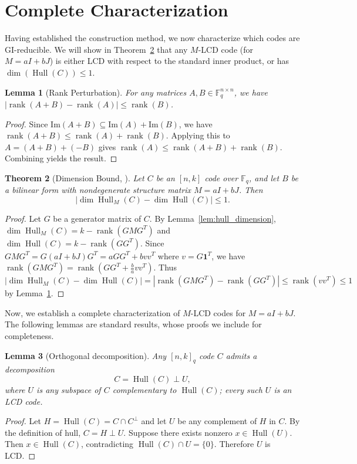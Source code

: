 \documentclass[11pt]{article}
\newcommand{\FF}{\mathbb{F}}
\newcommand{\0}{\mathbf{0}}
\newcommand{\1}{\mathbf{1}}
\DeclareMathOperator{\Hull}{Hull}
\DeclareMathOperator{\rank}{rank}
\theoremstyle{plain}
\newtheorem{theorem}{Theorem}[section]
\newtheorem{lemma}[theorem]{Lemma}
\theoremstyle{definition}
\theoremstyle{remark}
\begin{document}
\section{Complete Characterization}
\label{sec:characterization}

Having established the construction method, we now characterize which codes are GI-reducible. We will show in Theorem~\ref{thm:dimension_bound} that any $M$-LCD code (for $M = aI + bJ$) is either LCD with respect to the standard inner product, or has $\dim(\Hull(C)) \leq 1$.

\begin{lemma}[Rank Perturbation]
\label{lemma:rank_perturbation}
For any matrices $A, B \in \FF_q^{n \times n}$, we have
$|\rank(A + B) - \rank(A)| \leq \rank(B)$.
\end{lemma}
\begin{proof}
Since $\text{Im}(A+B) \subseteq \text{Im}(A) + \text{Im}(B)$, we have $\rank(A+B) \leq \rank(A) + \rank(B)$. Applying this to $A = (A+B) + (-B)$ gives $\rank(A) \leq \rank(A+B) + \rank(B)$. Combining yields the result.
\end{proof}

\begin{theorem}[Dimension Bound, \cite{ishizuka2025ccsposter}]
\label{thm:dimension_bound}
Let $C$ be an $[n, k]$ code over $\FF_q$, and let $B$ be a bilinear form with nondegenerate structure matrix $M = aI + bJ$. Then
\[
|\dim \Hull_M(C) - \dim \Hull(C)| \leq 1.
\]
\end{theorem}

\begin{proof}
Let $G$ be a generator matrix of $C$. By Lemma~\ref{lem:hull_dimension}, $\dim \Hull_M(C) = k - \rank(GMG^T)$ and $\dim \Hull(C) = k - \rank(GG^T)$. Since $GMG^T = G(aI + bJ)G^T = aGG^T + bvv^T$ where $v = G\1^T$, we have $\rank(GMG^T) = \rank(GG^T + \frac{b}{a}vv^T)$. Thus $|\dim \Hull_M(C) - \dim \Hull(C)| = |\rank(GMG^T) - \rank(GG^T)| \leq \rank(vv^T) \leq 1$ by Lemma~\ref{lemma:rank_perturbation}.
\end{proof}

Now, we establish a complete characterization of $M$-LCD codes for $M=aI+bJ$. The following lemmas are standard results, whose proofs we include for completeness.

\begin{lemma}[Orthogonal decomposition]
\label{lem:orthogonal_decomposition}
Any $[n,k]_q$ code $C$ admits a decomposition
$$
C = \Hull(C) \perp U,
$$
where $U$ is any subspace of $C$ complementary to $\Hull(C)$; every such $U$ is an LCD code.
\end{lemma}
\begin{proof}
Let $H = \Hull(C) = C \cap C^\perp$ and let $U$ be any complement of $H$ in $C$. By the definition of hull, $C = H \perp U$.
Suppose there exists nonzero $x \in \Hull(U)$.
Then $x \in \Hull(C)$, contradicting $\Hull(C) \cap U = \{0\}$.
Therefore $U$ is LCD.
\end{proof}
\end{document}
